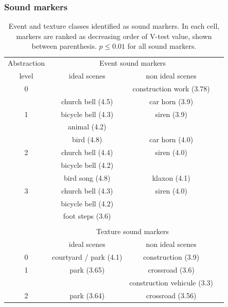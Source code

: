 \documentclass[12pt]{elsarticle}
\begin{document}
\subsubsection*{Sound markers}

\begin{table}[t]
 \setlength{\tabcolsep}{0.2pt}
 \centering
  {\renewcommand{\arraystretch}{0.9}
\begin{tabular}{c c c c}
Abstraction        & \multicolumn{2}{c}{Event sound markers} \\
level & ideal scenes & non ideal scenes \\
\hline
0  &                          & construction work (3.78)  \\
\hline
  & church bell  (4.5)             & car horn  (3.9) \\
1 & bicycle bell  (4.3)      & siren (3.9)\\
  & animal (4.2)              &       \\
   \hline
  & bird        (4.8)       & car horn  (4.0)\\
2 & church bell  (4.4)             & siren (4.0)\\
  & bicycle bell     (4.2)             &       \\
   \hline
  & bird song (4.8)        & klaxon  (4.1)\\
3 & church bell   (4.3)            & siren (4.0)\\
  & bicycle bell      (4.2)   &       \\
  & foot steps  (3.6)      &  \\
  &                           & \\
  & \multicolumn{2}{c}{Texture sound markers}      \\
  & ideal scenes & non ideal scenes \\
\hline
0 &     courtyard / park (4.1) &  construction (3.9)  \\
\hline
1 &     park (3.65)          &  crossroad (3.6)  \\
  &                          &  construction vehicule (3.3)  \\
\hline
2 &     park (3.64)          &  crossroad (3.56)  \\
\hline
\end{tabular}
}
\vspace{0.5mm}
\caption{Event and texture classes identified as sound markers. In each cell, markers are ranked as decreasing order of V-test value, shown between parenthesis. $p\leq0.01$ for all sound markers.}
\label{tab:markers}
\end{table}
\end{document}

